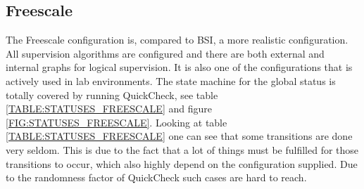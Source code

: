 \subsection{Freescale}
The Freescale configuration is, compared to BSI, a more realistic
configuration.  All supervision algorithms are configured and there
are both external and internal graphs for logical supervision. It is
also one of the configurations that is actively used in lab
environments. The state machine for the global status is totally
covered by running QuickCheck, see table
\ref{TABLE:STATUSES_FREESCALE} and figure
\ref{FIG:STATUSES_FREESCALE}. Looking at table \ref{TABLE:STATUSES_FREESCALE}
one can see that some transitions are done very seldom. This is due to the fact
that a lot of things must be fulfilled for those transitions to occur, which
also highly depend on the configuration supplied. Due to the randomness factor
of QuickCheck such cases are hard to reach.

